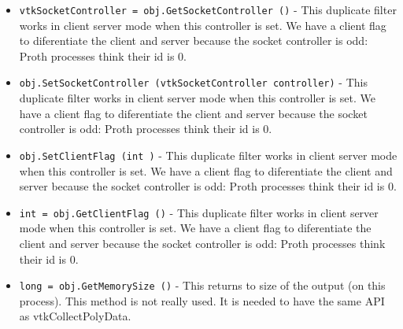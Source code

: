 \begin{itemize}
\item  \verb|vtkSocketController = obj.GetSocketController ()| -  This duplicate filter works in client server mode when this
 controller is set.  We have a client flag to diferentiate the
 client and server because the socket controller is odd:
 Proth processes think their id is 0.

\item  \verb|obj.SetSocketController (vtkSocketController controller)| -  This duplicate filter works in client server mode when this
 controller is set.  We have a client flag to diferentiate the
 client and server because the socket controller is odd:
 Proth processes think their id is 0.

\item  \verb|obj.SetClientFlag (int )| -  This duplicate filter works in client server mode when this
 controller is set.  We have a client flag to diferentiate the
 client and server because the socket controller is odd:
 Proth processes think their id is 0.

\item  \verb|int = obj.GetClientFlag ()| -  This duplicate filter works in client server mode when this
 controller is set.  We have a client flag to diferentiate the
 client and server because the socket controller is odd:
 Proth processes think their id is 0.

\item  \verb|long = obj.GetMemorySize ()| -  This returns to size of the output (on this process).
 This method is not really used.  It is needed to have
 the same API as vtkCollectPolyData.

\end{itemize}
